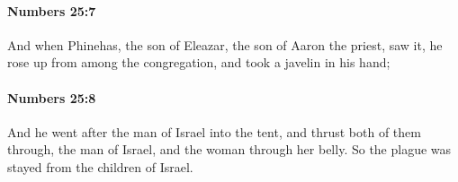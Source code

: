 		\paragraph{Numbers 25:7} %
			\label{NUMBERS-25-7}

			And when Phinehas, the son of Eleazar, the son of Aaron the priest, saw it, he rose up from among the congregation, and took a javelin in his hand;


		\paragraph{Numbers 25:8} %
			\label{NUMBERS-25-8}

			And he went after the man of Israel into the tent, and thrust both of them through, the man of Israel, and the woman through her belly. So the plague was stayed from the children of Israel.


